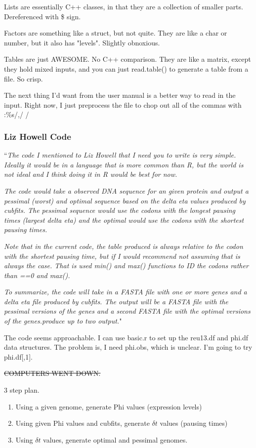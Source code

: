 \documentclass[11pt]{article} %
\begin{document}
Lists are essentially C++ classes, in that they are a collection of smaller parts. Dereferenced with \$ sign.

Factors are something like a struct, but not quite. They are like a char or number, but it also has "levels". Slightly obnoxious.

Tables are just AWESOME. No C++ comparison. They are like a matrix, except they hold mixed inputs, and you can just read.table() to generate a table from a file. So crisp.

The next thing I'd want from the user manual is a better way to read in the input. Right now, I just preprocess the file to chop out all of the commas with :\%s/,/ /

\subsubsection{Liz Howell Code}
``\textit{The code I mentioned to Liz Howell that I need you to write is very simple. Ideally it would be in a language that is more common than R, but the world is not ideal and I think doing it in R would be best for now.}

\textit{The code would take a observed DNA sequence for an given protein and output a pessimal (worst) and optimal sequence based on the delta eta values produced by cubfits.  The pessimal sequence would use the codons with the longest pausing times (largest delta eta) and the optimal would use the codons with the shortest pausing times.}

\textit{Note that in the current code, the table produced is always relative to the codon with the shortest pausing time, but if I would recommend not assuming that is always the case.  That is used min() and max() functions to ID the codons rather than ==0 and max().}

\textit{To summarize, the code will take in a FASTA file with one or more genes and a delta eta file produced by cubfits.  The output will be a FASTA file with the pessimal versions of the genes and a second FASTA file with the optimal versions of the genes.produce up to two output.}"


The code seems approachable. I can use basic.r to set up the reu13.df and phi.df data structures. The problem is, I need phi.obs, which is unclear. I'm going to try phi.df[,1].

\sout{COMPUTERS WENT DOWN.}

3 step plan.

\begin{enumerate}
\item Using a given genome, generate Phi values (expression levels)
\item Using given Phi values and cubfits, generate $\delta t$ values (pausing times)
\item Using $\delta t$ values, generate optimal and pessimal genomes.
\end{enumerate}
\end{document}
